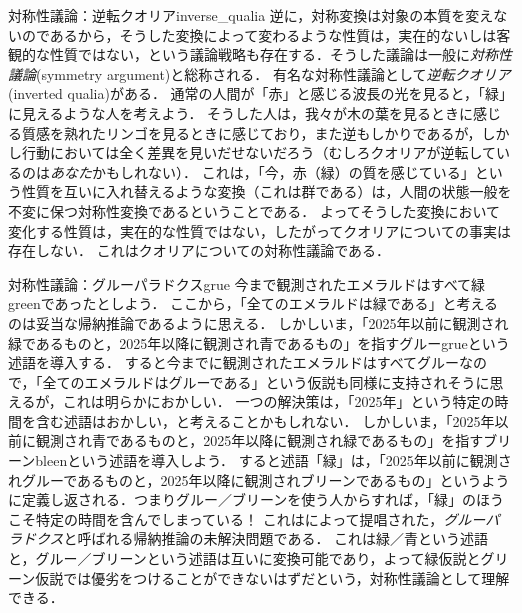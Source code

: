 \documentclass[11pt,a4paper]{jsarticle}
\begin{document}
\begin{rei}{対称性議論：逆転クオリア}{inverse_qualia}
逆に，対称変換は対象の本質を変えないのであるから，そうした変換によって変わるような性質は，実在的ないしは客観的な性質ではない，という議論戦略も存在する．そうした議論は一般に\emph{対称性議論}(symmetry argument)と総称される．
有名な対称性議論として\emph{逆転クオリア}(inverted qualia)がある．
通常の人間が「赤」と感じる波長の光を見ると，「緑」に見えるような人を考えよう．
そうした人は，我々が木の葉を見るときに感じる質感を熟れたリンゴを見るときに感じており，また逆もしかりであるが，しかし行動においては全く差異を見いだせないだろう（むしろクオリアが逆転しているのは\emph{あなた}かもしれない）．
これは，「今，赤（緑）の質を感じている」という性質を互いに入れ替えるような変換（これは群である）は，人間の状態一般を不変に保つ対称性変換であるということである．
よってそうした変換において変化する性質は，実在的な性質ではない，したがってクオリアについての事実は存在しない．
これはクオリアについての対称性議論である．
\end{rei}

\begin{rei}{対称性議論：グルーパラドクス}{grue}
今まで観測されたエメラルドはすべて緑greenであったとしよう．
ここから，「全てのエメラルドは緑である」と考えるのは妥当な帰納推論であるように思える．
しかしいま，「2025年以前に観測され緑であるものと，2025年以降に観測され青であるもの」を指すグルーgrueという述語を導入する．
すると今までに観測されたエメラルドはすべてグルーなので，「全てのエメラルドはグルーである」という仮説も同様に支持されそうに思えるが，これは明らかにおかしい．
一つの解決策は，「2025年」という特定の時間を含む述語はおかしい，と考えることかもしれない．
しかしいま，「2025年以前に観測され青であるものと，2025年以降に観測され緑であるもの」を指すブリーンbleenという述語を導入しよう．
すると述語「緑」は，「2025年以前に観測されグルーであるものと，2025年以降に観測されブリーンであるもの」というように定義し返される．つまりグルー／ブリーンを使う人からすれば，「緑」のほうこそ特定の時間を含んでしまっている！
これは\cite{Goodman1955-nr}によって提唱された，\emph{グルーパラドクス}と呼ばれる帰納推論の未解決問題である．
これは緑／青という述語と，グルー／ブリーンという述語は互いに変換可能であり，よって緑仮説とグリーン仮説では優劣をつけることができないはずだという，対称性議論として理解できる．
\end{rei}
\end{document}
